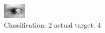 \begin{figure}[h!]
\begin{center}
\includegraphics[width=0.60\columnwidth]{figures/ID803_class_2_target_4.png}
\end{center}
\caption{ Classification: 2 actual target: 4}
\label{fig:ID803_class_2_target_4}
\end{figure}

